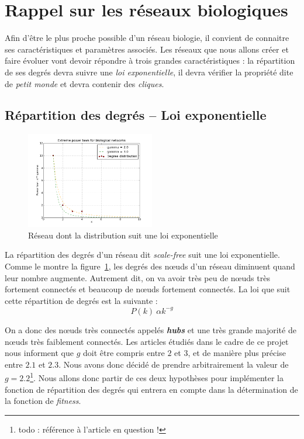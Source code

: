\section{Rappel sur les réseaux biologiques}
Afin d'être le plus proche possible d'un réseau biologie, il convient de connaitre ses caractéristiques et paramètres associés. Les réseaux que nous allons créer et faire évoluer vont devoir répondre à trois grandes caractéristiques : la répartition de ses degrés devra suivre une \textit{loi exponentielle}, il devra vérifier la propriété dite de \textit{\og petit monde \fg} et devra contenir des \textit{cliques}.

\subsection{Répartition des degrés -- Loi exponentielle}
\begin{figure}
  \vspace{-30pt}
  \begin{center}
    \includegraphics[width=0.50\textwidth]{plot.png}
  \end{center}
  \caption{Réseau dont la distribution suit une loi exponentielle}
  \label{scalefree}
\end{figure}
La répartition des degrés d'un réseau dit \textit{scale-free} suit une loi exponentielle. Comme le montre la figure~\ref{scalefree}, les degrés des nœuds d'un réseau diminuent quand leur nombre augmente. Autrement dit, on va avoir très peu de nœuds très fortement connectés et beaucoup de nœuds fortement connectés. La loi que suit cette répartition de degrés est la suivante :
$$ P(k) ~ \alpha k^{-g} $$

On a donc des nœuds très connectés appelés \textit{\textbf{hubs}} et une très grande majorité de nœuds très faiblement connectés.	Les articles étudiés dans le cadre de ce projet nous informent que $g$ doit être compris entre $2$ et $3$, et de manière plus précise entre $2.1$ et $2.3$. Nous avons donc décidé de prendre arbitrairement la valeur de $g=2.2$\footnote{todo : référence à l'article en question !}. Nous allons donc partir de ces deux hypothèses pour implémenter la fonction de répartition des degrés qui entrera en compte dans la détermination de la fonction de \textit{fitness}.

